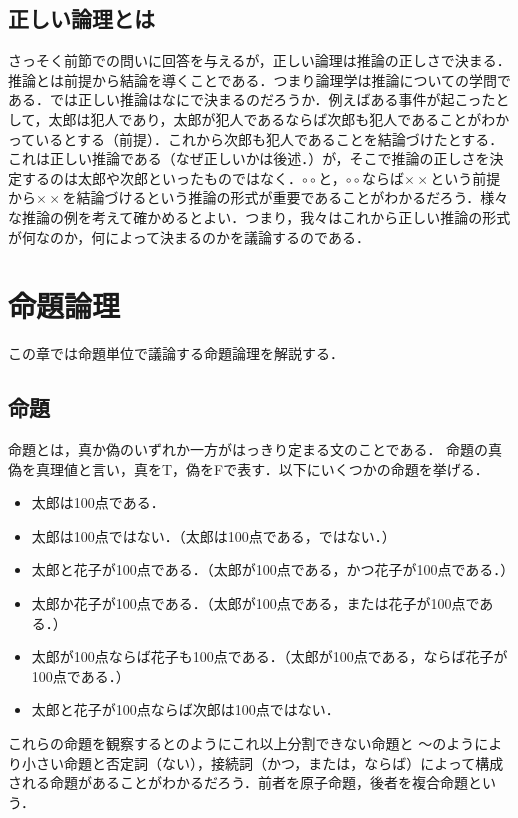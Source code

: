 \documentclass[10pt,b5paper,papersize,dvipdfmx]{jsbook}
\begin{document}
\subsection{正しい論理とは}
さっそく前節での問いに回答を与えるが，正しい論理は推論の正しさで決まる．推論とは前提から結論を導くことである．つまり論理学は推論についての学問である．では正しい推論はなにで決まるのだろうか．例えばある事件が起こったとして，太郎は犯人であり，太郎が犯人であるならば次郎も犯人であることがわかっているとする（前提）．これから次郎も犯人であることを結論づけたとする．これは正しい推論である（なぜ正しいかは後述．）が，そこで推論の正しさを決定するのは太郎や次郎といったものではなく．$\circ \circ$と，$\circ \circ$ならば$\times \times$という前提から$\times \times$を結論づけるという推論の形式が重要であることがわかるだろう．様々な推論の例を考えて確かめるとよい．つまり，我々はこれから正しい推論の形式が何なのか，何によって決まるのかを議論するのである．
\section{命題論理}
この章では命題単位で議論する命題論理を解説する．
\subsection{命題}
命題とは，真か偽のいずれか一方がはっきり定まる文のことである．
命題の真偽を真理値と言い，真をT，偽をFで表す．以下にいくつかの命題を挙げる．
\begin{itemize}
  \item[\maru{1}]太郎は100点である．
  \item[\maru{2}]太郎は100点ではない．（太郎は100点である，ではない．）
  \item[\maru{3}]太郎と花子が100点である．（太郎が100点である，かつ花子が100点である．）
  \item[\maru{4}]太郎か花子が100点である．（太郎が100点である，または花子が100点である．）
  \item[\maru{5}]太郎が100点ならば花子も100点である．（太郎が100点である，ならば花子が100点である．）
  \item[\maru{6}]太郎と花子が100点ならば次郎は100点ではない．
\end{itemize}
これらの命題を観察するとのようにこれ以上分割できない命題と
～のようにより小さい命題と否定詞（ない），接続詞（かつ，または，ならば）によって構成される命題があることがわかるだろう．前者を原子命題，後者を複合命題という．
\end{document}
